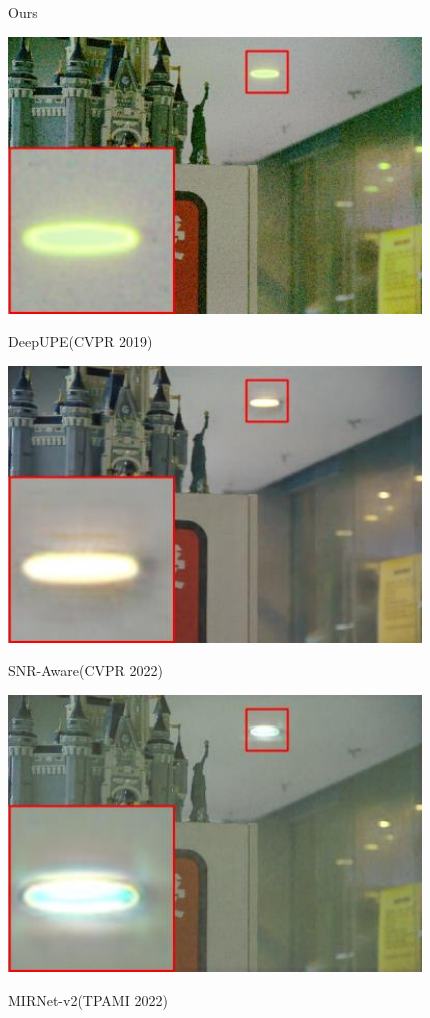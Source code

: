 \documentclass[CJK,aspectratio=169]{beamer}  %
\begin{document}
\begin{frame}
\begin{figure}
\begin{minipage}{.31\textwidth}
				\captionsetup{font=scriptsize}
				\label{fig: Ours}	
				\caption*{Ours}
			\end{minipage}
			\begin{minipage}{.31\textwidth}
				\centering
				\includegraphics[width=.8\linewidth]{picture/LLIE/SCNet/DeepUPE(CVPR 2019)}
				\captionsetup{font=scriptsize}
				\label{fig: DeepUPE(CVPR 2019)}	
				\caption*{DeepUPE(CVPR 2019)}
			\end{minipage}
			\begin{minipage}{.31\textwidth}
				\centering
				\includegraphics[width=.8\linewidth]{picture/LLIE/SCNet/SNR-Aware(CVPR 2022)}
				\captionsetup{font=scriptsize}
				\label{fig: SNR-Aware(CVPR 2022)}	
				\caption*{SNR-Aware(CVPR 2022)}
			\end{minipage}
			\begin{minipage}{.31\textwidth}
				\centering
				\includegraphics[width=.8\linewidth]{picture/LLIE/SCNet/MIRNet-v2(TPAMI 2022)}
				\captionsetup{font=scriptsize}
				\label{fig: MIRNet-v2(TPAMI 2022)}	
				\caption*{MIRNet-v2(TPAMI 2022)}
			\end{minipage}
			

\end{figure}
\end{frame}
\end{document}
